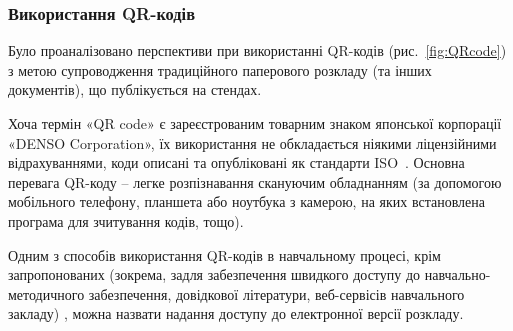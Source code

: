 \subsubsection{Використання QR-кодів}

Було проаналізовано перспективи при використанні QR-кодів (рис.~\ref{fig:QRcode}) з метою супроводження традиційного паперового розкладу (та інших документів), що публікується на стендах.

Хоча термін «QR code» є зареєстрованим товарним знаком японської корпорації «DENSO Corporation», їх використання не обкладається ніякими ліцензійними відрахуваннями, коди описані та опубліковані як стандарти ISO~\cite{воронкін2014можливості}. Основна перевага QR-коду – легке розпізнавання скануючим обладнанням (за допомогою мобільного телефону, планшета або ноутбука з камерою, на яких встановлена програма для зчитування кодів, тощо).

Одним з способів використання QR-кодів в навчальному процесі, крім запропонованих (зокрема, задля забезпечення швидкого доступу до навчально-методичного забезпечення, довідкової літератури, веб-сервісів навчального закладу) \cite{воронкін2014можливості},  можна назвати надання доступу до електронної версії розкладу.
